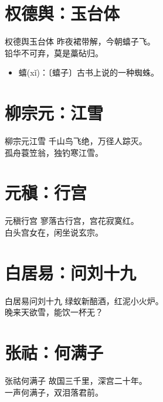 \documentclass[12pt,oneside,a5paper]{book}
\begin{document}
\chapter{权德舆：玉台体}
\begin{poemzh}{权德舆}{玉台体}
昨夜裙带解，今朝蟢子飞。\\
铅华不可弃，莫是藁砧归。\\ 
\end{poemzh}

\begin{itemize}
\item 蟢(xǐ)：〔蟢子〕古书上说的一种蜘蛛。
\end{itemize}


\chapter{柳宗元：江雪}
\begin{poemzh}{柳宗元}{江雪}
千山鸟飞绝，万径人踪灭。\\
孤舟蓑笠翁，独钓寒江雪。\\ 
\end{poemzh}

\chapter{元稹：行宫}
\begin{poemzh}{元稹}{行宫}
寥落古行宫，宫花寂寞红。\\
白头宫女在，闲坐说玄宗。\\ 
\end{poemzh}

\chapter{白居易：问刘十九}
\begin{poemzh}{白居易}{问刘十九}
绿蚁新醅酒，红泥小火炉。\\
晚来天欲雪，能饮一杯无？\\ 
\end{poemzh}

\chapter{张祜：何满子}
\begin{poemzh}{张祜}{何满子}
故国三千里，深宫二十年。\\
一声何满子，双泪落君前。\\ 
\end{poemzh}
\end{document}
